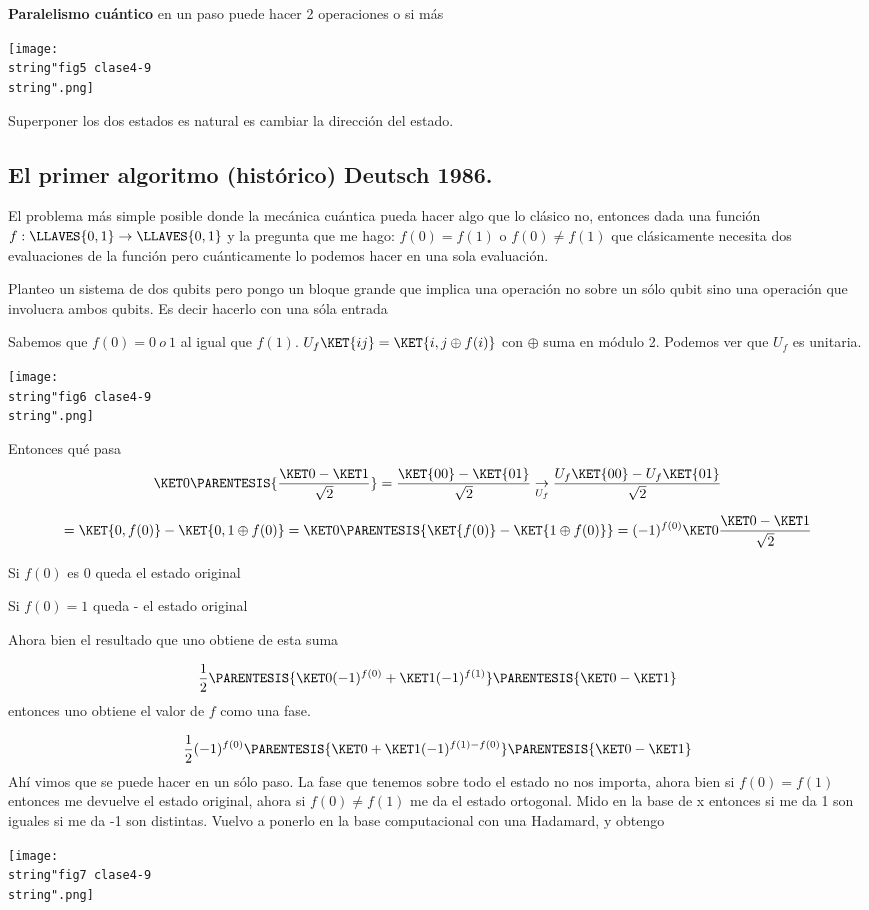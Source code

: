 \textbf{Paralelismo cuántico} en un paso puede hacer 2 operaciones
o si más 
\begin{center}
\texttt{[image: \\string"fig5 clase4-9\\string".png]}
\par\end{center}

Superponer los dos estados es natural es cambiar la dirección del
estado. 

\subsection{El primer algoritmo (histórico) Deutsch 1986.}

El problema más simple posible donde la mecánica cuántica pueda hacer
algo que lo clásico no, entonces dada una función $f:\LLAVES{0,1}\rightarrow\LLAVES{0,1}$
y la pregunta que me hago: $f(0)=f(1)$ o $f(0)\neq f(1)$ que clásicamente
necesita dos evaluaciones de la función pero cuánticamente lo podemos
hacer en una sola evaluación.

Planteo un sistema de dos qubits pero pongo un bloque grande que implica
una operación no sobre un sólo qubit sino una operación que involucra
ambos qubits. Es decir hacerlo con una sóla entrada

Sabemos que $f(0)=0\:o\:1$ al igual que $f(1)$. $U_{f}\KET{ij}=\KET{i,j\oplus f(i)}$
con $\oplus$ suma en módulo 2. Podemos ver que $U_{f}$ es unitaria. 
\begin{center}
\texttt{[image: \\string"fig6 clase4-9\\string".png]}
\par\end{center}

Entonces qué pasa 
\[
\KET 0\PARENTESIS{\frac{\KET 0-\KET 1}{\sqrt{2}}}=\frac{\KET{00}-\KET{01}}{\sqrt{2}}\underset{U_{f}}{\rightarrow}\frac{U_{f}\KET{00}-U_{f}\KET{01}}{\sqrt{2}}
\]

\[
=\KET{0,f(0)}-\KET{0,1\oplus f(0)}=\KET 0\PARENTESIS{\KET{f(0)}-\KET{1\oplus f(0)}}=(-1)^{f(0)}\KET 0\frac{\KET 0-\KET 1}{\sqrt{2}}
\]

Si $f(0)$ es 0 queda el estado original

Si $f(0)=1$ queda - el estado original

Ahora bien el resultado que uno obtiene de esta suma

\[
\frac{1}{2}\PARENTESIS{\KET 0(-1)^{f(0)}+\KET 1(-1)^{f(1)}}\PARENTESIS{\KET 0-\KET 1}
\]
entonces uno obtiene el valor de $f$ como una fase. 

\[
\frac{1}{2}(-1)^{f(0)}\PARENTESIS{\KET 0+\KET 1(-1)^{f(1)-f(0)}}\PARENTESIS{\KET 0-\KET 1}
\]
Ahí vimos que se puede hacer en un sólo paso. La fase que tenemos
sobre todo el estado no nos importa, ahora bien si $f(0)=f(1)$ entonces
me devuelve el estado original, ahora si $f(0)\neq f(1)$ me da el
estado ortogonal. Mido en la base de x entonces si me da 1 son iguales
si me da -1 son distintas. Vuelvo a ponerlo en la base computacional
con una Hadamard, y obtengo
\begin{center}
\texttt{[image: \\string"fig7 clase4-9\\string".png]}
\par\end{center}
